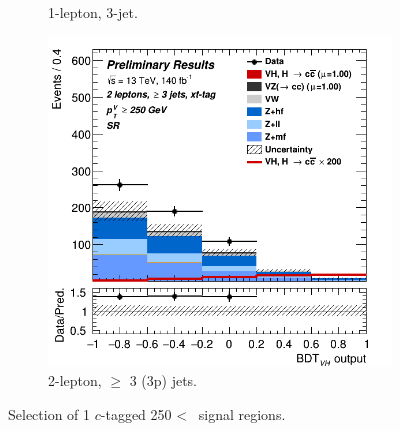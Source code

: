 \begin{figure}[h!]
\begin{subfigure}[b]{0.32\textwidth}
      \caption{1-lepton, 3-jet.}
      \label{fig:plots_VHcc_ex_1L_SR_1C}
  \end{subfigure}
  \begin{subfigure}[b]{0.32\textwidth}
    \centering
    \includegraphics[width=\textwidth]{Images/VH/Own_fit/prefit_VHcc/Region_distmva_BMin250_DSR_J3_TTypext_incJet1_T2_L2_Y6051_Prefit.png}
    \caption{2-lepton, $\geq$ 3 (3p) jets.}
    \label{fig:plots_VHcc_ex_2L_SR_1C}
\end{subfigure}
  \caption{Selection of 1 $c$-tagged 250 < \ptv\ signal regions.}
  \label{fig:plots_VHcc_ex_SR_1C}
\end{figure} 

